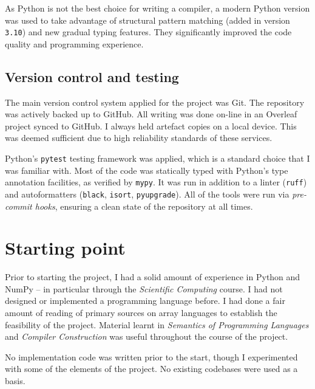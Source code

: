 As Python is not the best choice for writing a compiler, a modern Python version was used to take advantage of structural pattern matching (added in version \texttt{3.10}) and new gradual typing features. They significantly improved the code quality and programming experience. 

\subsection{Version control and testing}

The main version control system applied for the project was Git. The repository was actively backed up to GitHub. All writing was done on-line in an Overleaf project synced to GitHub. I always held artefact copies on a local device. This was deemed sufficient due to high reliability standards of these services. 

Python's \texttt{pytest} testing framework was applied, which is a standard choice that I was familiar with.
Most of the code was statically typed with Python's type annotation facilities, as verified by \texttt{mypy}. It was run in addition to a linter (\texttt{ruff}) and autoformatters (\texttt{black}, \texttt{isort}, \texttt{pyupgrade}). All of the tools were run via \textit{pre-commit hooks}, ensuring a clean state of the repository at all times.



\section{Starting point}
\label{starting-point}

Prior to starting the project, I had a solid amount of experience in Python and NumPy -- in particular through the \textit{Scientific Computing} course. I had not designed or implemented a programming language before. I had done a fair amount of reading of primary sources on array languages to establish the feasibility of the project. Material learnt in \textit{Semantics of Programming Languages} and \textit{Compiler Construction} was useful throughout the course of the project.

No implementation code was written prior to the start, though I experimented with some of the elements of the project. No existing codebases were used as a basis. 
